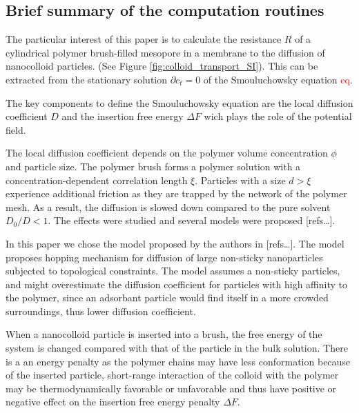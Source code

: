 \documentclass[10pt, a4paper]{article}
\newcommand\todo[1]{\textcolor{red}{#1}}
\begin{document}
\pagebreak
\subsection*{Brief summary of the computation routines}
\begin{multicols}{2}

The particular interest of this paper is to calculate the resistance $R$ of a cylindrical polymer brush-filled mesopore in a membrane to the diffusion of nanocolloid particles. (See Figure \ref{fig:colloid_transport_SI}).
This can be extracted from the stationary solution $\partial c_t = 0$ of the Smouluchowsky equation \todo{eq}. 

The key components to define the Smouluchowsky equation are the local diffusion coefficient $D$ and the insertion free energy $\Delta F$ wich plays the role of the potential field. 

The local diffusion coefficient depends on the polymer volume concentration $\phi$ and particle size. 
The polymer brush forms a polymer solution with a concentration-dependent correlation length $\xi$. 
Particles with a size $d>\xi$ experience additional friction as they are trapped by the network of the polymer mesh. 
As a result, the diffusion is slowed down compared to the pure solvent $D_0/D<1$.
The effects were studied and several models were proposed [refs\dots]. 

In this paper we chose the model proposed by the authors in [refs\dots]. 
The model proposes hopping mechanism for diffusion of large non-sticky nanoparticles subjected to topological constraints.
The model assumes a non-sticky particles, and might overestimate the diffusion coefficient for particles with high affinity to the polymer, since an adsorbant particle would find itself in a more crowded surroundings, thus lower diffusion coefficient.

When a nanocolloid particle is inserted into a brush, the free energy of the system is changed compared with that of the particle in the bulk solution. There is a an energy penalty as the polymer chains may have less conformation because of the inserted particle, short-range interaction of the colloid with the polymer may be thermodynamically favorable or unfavorable and thus have positive or negative effect on the insertion free energy penalty $\Delta F$.


\end{multicols}
\end{document}
